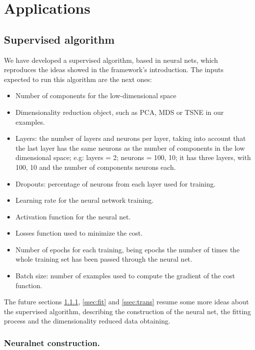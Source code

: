 \documentclass[a4paper,11pt,spanish]{report}
\begin{document}

\chapter{Applications}
\label{chap:app}

\section{Supervised algorithm}
\label{sec:sup}

\newpage
We have developed a supervised algorithm, based in neural nets, which reproduces the ideas showed in the framework's introduction.
The inputs expected to run this algorithm are the next ones:

\begin{itemize}
\item Number of components for the low-dimensional space
\item Dimensionality reduction object, such as PCA, MDS or TSNE in our examples.
\item Layers: the number of layers and neurons per layer, taking into account that the last layer has the same neurons as the number of components in the low dimensional space; e.g: layers = 2; neurons = 100, 10; it has three layers, with 100, 10 and the number of components neurons each.
\item Dropouts: percentage of neurons from each layer used for training.
\item Learning rate for the neural network training.
\item Activation function for the neural net.
\item Losses function used to minimize the cost.
\item Number of epochs for each training, being epochs the number of times the whole training set has been passed through the neural net.
\item Batch size: number of examples used to compute the gradient of the cost function.
\end{itemize}

The future sections \ref{ssec:nnc}, \ref{ssec:fit} and \ref{ssec:trans} resume some more ideas about the supervised algorithm, describing the construction of the neural net, the fitting process and the dimensionality reduced data obtaining.

\subsection{Neuralnet construction.}
\label{ssec:nnc}
\end{document}
